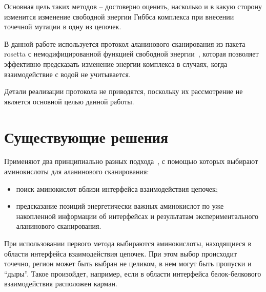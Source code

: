 Основная цель таких методов -- достоверно оценить, насколько и в какую сторону изменится изменение свободной энергии Гиббса \ddG комплекса при внесении точечной мутации в одну из цепочек.

В данной работе используется протокол аланинового сканирования из пакета rosetta с немодифицированной функцией свободной энергии~\cite{kortemme2002}, которая позволяет эффективно предсказать изменение энергии комплекса в случаях, когда  взаимодействие с водой не учитывается.

Детали реализации протокола не приводятся, поскольку их рассмотрение не является основной целью данной работы.





\section{Существующие решения}


Применяют два принципиально разных подхода~\cite{hotspots2012rev}, с помощью которых выбирают аминокислоты для аланинового сканирования: 
\begin{itemize}
\item поиск аминокислот вблизи интерфейса взаимодействия цепочек;
\item предсказание позиций энергетически важных аминокислот по уже накопленной информации об интерфейсах и результатам экспериментального аланинового сканирования.
\end{itemize}


При использовании первого метода выбираются аминокислоты, находящиеся в области интерфейса взаимодействия цепочек. При этом выбор происходит точечно, регион может быть выбран не целиком, в нем могут быть пропуски и “дыры”. Такое произойдет, например, если в области интерфейса белок-белкового взаимодействия расположен карман.

